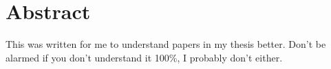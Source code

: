 \vspace*{1cm}
\section*{Abstract}
This was written for me to understand papers in my thesis better. 
Don't be alarmed if you don't understand it 100\%, I probably don't either. 